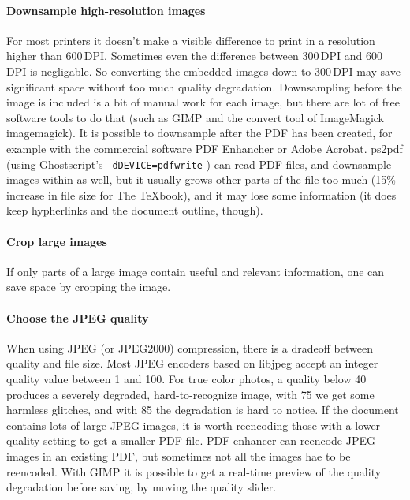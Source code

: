 \documentclass{ltugproc}
\def\cmd{\textsf}
\begin{document}
\paragraph{Downsample high-resolution images}

For most printers it doesn't make a visible difference to print in a
resolution higher than 600\,DPI. Sometimes even the difference between
300\,DPI and 600\,DPI is negligable. So converting the embedded images down
to 300\,DPI may save significant space without too much quality degradation.
Downsampling before the image is included is a bit of manual work
for each image, but there are lot of free software tools to do that (such as
GIMP \cite{gimp} and the \cmd{convert} tool of ImageMagick \cmd{imagemagick}).
It is possible to downsample after the PDF has been created, for example
with the commercial software PDF Enhancher \cite{pdf-enhancer} or Adobe
Acrobat. \cmd{ps2pdf}
(using Ghostscript's \texttt{-dDEVICE=pdfwrite} \cite{pdfwrite-params}) can
read PDF files, and downsample images within as well, but it usually grows
other parts of the file too much (15\% increase in file size for The
\TeX{}book), and it may lose some information (it does
keep hypherlinks and the document outline, though).

\paragraph{Crop large images}

If only parts of a large image contain useful and relevant information, one
can save space by cropping the image.

\paragraph{Choose the JPEG quality}

When using JPEG (or JPEG2000) compression, there is a dradeoff between
quality and file size. Most JPEG encoders based on libjpeg accept an integer
quality value between 1 and 100. For true color photos, a quality below 40
produces a severely degraded, hard-to-recognize image, with 75 we get some
harmless glitches, and with 85 the degradation is hard to notice. If the
document contains lots of large JPEG images, it is worth reencoding those
with a lower quality setting to get a smaller PDF file. PDF enhancer can
reencode JPEG images in an existing PDF, but sometimes not all the images
hae to be reencoded. With GIMP it is possible to get a real-time preview of
the quality degradation before saving, by moving the quality slider.
\end{document}
